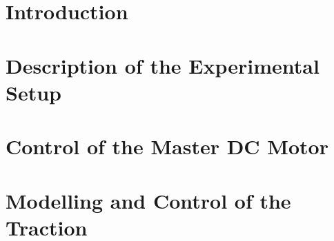 



\setcounter{page}{2}
\tableofcontents

\hypersetup{allcolors = link}
\chapter{Introduction}


\chapter{Description of the Experimental Setup}
\label{chap:setup}


\chapter{Control of the Master DC Motor}
\label{chap:masterDC}


\chapter{Modelling and Control of the Traction}
\label{chap:traction}



